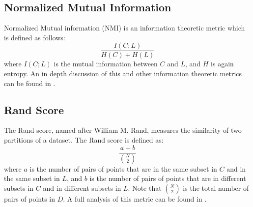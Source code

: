 \subsection{Normalized Mutual Information}
Normalized Mutual information (NMI) is an information theoretic metric which is defined as follows:  
\begin{equation}
\frac{I(C;L)}{H(C)+H(L)}
\end{equation}
where $I(C;L)$ is the mutual information between $C$ and $L$, and $H$ is  again entropy. An in depth discussion of this and other information theoretic metrics can be found in \cite{info}.

\subsection{Rand Score}
The Rand score, named after William M. Rand, measures the similarity of two partitions of a dataset. The Rand score is defined as:
\begin{equation}
\frac{a+b}{\binom{N}{2}}
\end{equation}
where $a$ is the number of pairs of points that are in the same subset in $C$ and in the same subset in $L$, and $b$ is the number of pairs of points  that are in different subsets in $C$ and in different subsets in $L$. Note that $\binom{N}{2}$ is the total number of pairs of points in $D$. A full analysis of this metric can be found in \cite{rand}.


